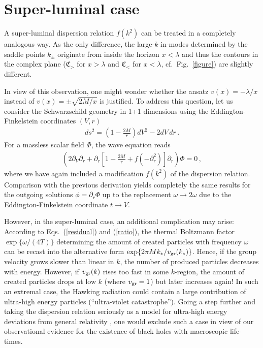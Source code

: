 \documentclass[12pt,aps,prl,showpacs,amssymb,nofootinbib,onecolumn]{revtex4-2}
\newcommand{\bea}{\begin{eqnarray}}
\newcommand{\ea}{\end{eqnarray}}
\begin{document}
\section{Super-luminal case}\quad
%
A super-luminal dispersion relation $f(k^2)$ can be treated in a
completely analogous way.
%
As the only difference, the large-$k$ in-modes determined by the
saddle points $k_\pm$ originate from inside the horizon $x<\lambda$
and thus the contours in the complex plane 
(${\mathfrak C}_>$ for $x>\lambda$ and ${\mathfrak C}_<$ for
$x<\lambda$, cf.~Fig.~\ref{figure}) are slightly different.

In view of this observation, one might wonder whether the ansatz 
$v(x)=-\lambda/x$ instead of $v(x)=\pm\sqrt{2M/x}$ is justified. 
%
To address this question, let us consider the Schwarzschild geometry
in 1+1 dimensions using the Eddington-Finkelstein coordinates $(V,r)$ 
%
\bea
ds^2=\left(1-\frac{2M}{r}\right)dV^2-2dV\,dr
\,.
\ea
%
For a massless scalar field $\Phi$, the wave equation reads 
%
\bea
\left(2\partial_V\partial_r+
\partial_r\left[1-\frac{2M}{r}+f(-\partial_r^2)\right]\partial_r
\right)\Phi=0
\,,
\ea
%
where we have again included a modification $f(k^2)$ of the dispersion 
relation. 
%
Comparison with the previous derivation yields completely the same
results for the outgoing solutions $\phi=\partial_r\Phi$ up to the
replacement $\omega\to2\omega$ due to the Eddington-Finkelstein
coordinate $t \to V$. 

However, in the super-luminal case, an additional complication may
arise: 
%
According to Eqs.~(\ref{residual}) and (\ref{ratio}), the thermal
Boltzmann factor $\exp\{\omega/(4T)\}$ determining the amount of
created particles with frequency $\omega$ can be recast into 
the alternative form $\exp\{2\pi M k_*/v_{\rm gr}(k_*)\}$.  
%
Hence, if the group velocity grows slower than linear in $k$,  
the number of produced particles decreases with energy.  
%
However, if $v_{\rm gr}(k)$ rises too fast in some $k$-region, the
amount of created particles drops at low $k$ (where $v_{\rm gr}=1$)
but later increases again!
%
In such an extremal case, the Hawking radiation could contain a large  
contribution of ultra-high energy particles 
(``ultra-violet catastrophe'').  
%
Going a step further and taking the dispersion relation seriously as a
model for ultra-high energy deviations from general relativity
\cite{metric}, one would exclude such a case in view of our
observational evidence for the existence of black holes with
macroscopic life-times.  
\end{document}
